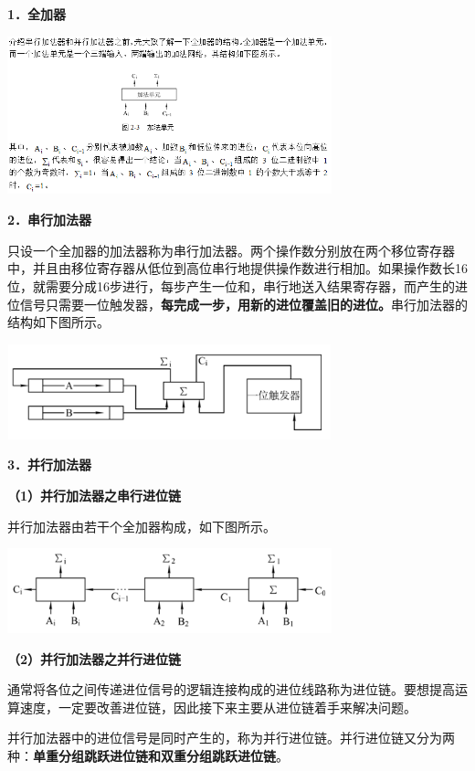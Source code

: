 \textbf{{1．全加器}}

\includegraphics[width=3.69792in,height=1.80208in]{png-jpeg-pics/D212BB742A2C8EB7953DF64B5B055B80.png}

\textbf{{2．串行加法器}}

只设一个全加器的加法器称为串行加法器。两个操作数分别放在两个移位寄存器中，并且由移位寄存器从低位到高位串行地提供操作数进行相加。如果操作数长16位，就需要分成16步进行，每步产生一位和，串行地送入结果寄存器，而产生的进位信号只需要一位触发器，\textbf{每完成一步，用新的进位覆盖旧的进位。}串行加法器的结构如下图所示。

\includegraphics[width=3.69792in,height=1.08333in]{png-jpeg-pics/A79214652D46A367F8629A9938BFE335.png}

\textbf{{3．并行加法器}}

\textbf{（1）并行加法器之串行进位链}

并行加法器由若干个全加器构成，如下图所示。

\includegraphics[width=3.69792in,height=0.96875in]{png-jpeg-pics/DDE1F61399F22CA753CD88E3DFBDF8B8.png}

\textbf{（2）并行加法器之并行进位链}

{通常将各位之间传递进位信号的逻辑连接构成的进位线路称为进位链。}{}要想提高运算速度，一定要改善进位链，因此接下来主要从进位链着手来解决问题。

{并行加法器中的进位信号是同时产生的，称为并行进位链。}{并行进位链又分为两种：}\textbf{单重分组跳跃进位链和双重分组跳跃进位链}{。}
